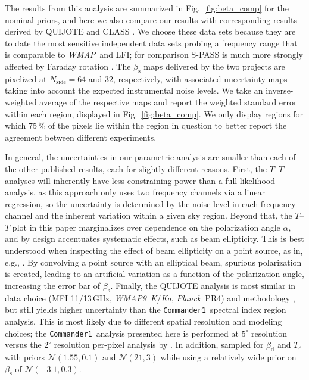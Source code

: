 \documentclass[twocolumn]{../../common/aa}
\def\WMAP{\emph{WMAP}}
\def\WMAPnine{\emph{WMAP9}}
\def\Planck{\emph{Planck}}
\def\commanderone{\texttt{Commander1}}
\newcommand{\K}[0]{\textit K}
\newcommand{\Ka}[0]{\textit{Ka}}
\begin{document}
The results from this analysis are summarized in Fig.~\ref{fig:beta_comp} for the nominal priors, and here we also compare our results with corresponding results derived by QUIJOTE \citep{QUIJOTE_VIII} and CLASS \citep{eimer2023}. We choose these data sets because they are to date the most sensitive independent data sets probing a frequency range that is comparable to \WMAP\ and LFI; for comparison S-PASS is much more strongly affected by Faraday rotation \citep{krachmalnicoff2018,fuskeland:2019}. The $\beta_\mathrm s$ maps delivered by the two projects are pixelized at $N_\mathrm{side}=64$ and 32, respectively, with associated uncertainty maps taking into account the expected instrumental noise levels. We take an inverse-weighted average of the respective maps and report the weighted standard error within each region, displayed in Fig.~\ref{fig:beta_comp}. We only display regions for which 75\,\% of the pixels lie within the region in question to better report the agreement between different experiments.


In general, the uncertainties in our parametric analysis are smaller than each of the other published results, each for slightly different reasons. First, the $T$--$T$ analyses will inherently have less constraining power than a full likelihood analysis, as this approach only uses two frequency channels via a linear regression, so the uncertainty is determined by the noise level in each frequency channel and the inherent variation within a given sky region. Beyond that, the $T$--$T$ plot in this paper marginalizes over dependence on the polarization angle $\alpha$, and by design accentuates systematic effects, such as beam ellipticity. 
This is best understood when inspecting the effect of beam ellipticity on a point source, as in, e.g., \citet{wehus:2013}. By convolving a point source with an elliptical beam, spurious polarization is created, leading to an artificial variation as a function of the polarization angle, increasing the error bar of $\beta_\mathrm{s}$.
Finally, the QUIJOTE analysis is most similar in data choice (MFI 11/13\,GHz, \WMAPnine\ \K/\Ka, \Planck\ PR4) and methodology \citep[\texttt{B-SeCRET};][]{b-secret}, but still yields higher uncertainty than the \commanderone\ spectral index region analysis. This is most likely due to different spatial resolution and modeling choices; the \commanderone\ analysis presented here is performed at $5^\circ$ resolution versus the $2^\circ$ resolution per-pixel analysis by \citet{QUIJOTE_VIII}. In addition, \citet{QUIJOTE_VIII} sampled for $\beta_\mathrm d$ and $T_\mathrm{d}$ with priors $\mathcal N(1.55,0.1)$ and $\mathcal N(21,3)$ while using a relatively wide prior on $\beta_\mathrm s$ of $\mathcal N(-3.1, 0.3)$.
\end{document}
